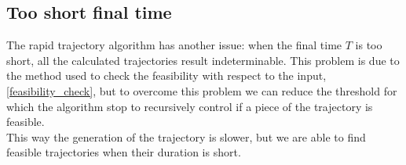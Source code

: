 %
%


\subsection{Too short final time}
The rapid trajectory algorithm has another issue: when the final time $T$ is too short, all the calculated trajectories result indeterminable. This problem is due to the method used to check the feasibility with respect to the input, \ref{feasibility_check}, but to overcome this problem we can reduce the threshold for which the algorithm stop to recursively control if a piece of the trajectory is feasible.\\
This way the generation of the trajectory is slower, but we are able to find feasible trajectories when their duration is short.

